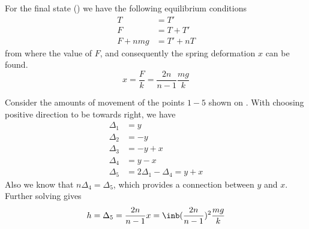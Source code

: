 For the final state () we have the following equilibrium conditions
\begin{equation}
\begin{split}
    T &= T' \\
    F &= T + T' \\
    F + nmg &= T' + nT
\end{split}
\end{equation}
from where the value of $F$, and consequently
the spring deformation $x$ can be found.
\begin{equation}
    x = \frac{F}{k} = \frac{2n}{n - 1} \frac{mg}{k}
\end{equation}

Consider the amounts of movement of the points $1-5$ shown on .
With choosing positive direction to be towards right, we have
\begin{equation}
\begin{split}
    \Delta_1 &= y \\
    \Delta_2 &= -y \\
    \Delta_3 &= -y + x \\
    \Delta_4 &= y - x \\
    \Delta_5 &= 2 \Delta_1 - \Delta_4 = y + x
\end{split}
\end{equation}
Also we know that $n \Delta_4 = \Delta_5$,
which provides a connection between $y$ and $x$.
Further solving gives
\begin{equation}
    h = \Delta_5 = \frac{2n}{n - 1} x = \inb({\frac{2n}{n - 1}})^2 \frac{mg}{k}
\end{equation}
